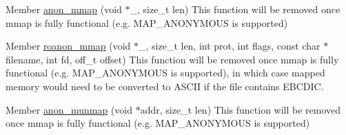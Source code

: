 
\begin{DoxyRefList}
\item[Member \mbox{\hyperlink{zos_8cc_a80836ddd1b6b15678df61b69152bacd5}{anon\+\_\+mmap}} (void $\ast$\+\_\+, size\+\_\+t len)]\label{deprecated__deprecated000001}%
%
This function will be removed once mmap is fully functional (e.\+g. M\+A\+P\+\_\+\+A\+N\+O\+N\+Y\+M\+O\+US is supported)  
\item[Member \mbox{\hyperlink{zos_8cc_a32c69fa6f4fe558cc2cfd9a9eb93096e}{roanon\+\_\+mmap}} (void $\ast$\+\_\+, size\+\_\+t len, int prot, int flags, const char $\ast$filename, int fd, off\+\_\+t offset)]\label{deprecated__deprecated000002}%
%
This function will be removed once mmap is fully functional (e.\+g. M\+A\+P\+\_\+\+A\+N\+O\+N\+Y\+M\+O\+US is supported), in which case mapped memory would need to be converted to A\+S\+C\+II if the file contains E\+B\+C\+D\+IC.  
\item[Member \mbox{\hyperlink{zos_8cc_aa00ab042a596dd63795d3791d34b8d29}{anon\+\_\+munmap}} (void $\ast$addr, size\+\_\+t len)]\label{deprecated__deprecated000003}%
%
This function will be removed once mmap is fully functional (e.\+g. M\+A\+P\+\_\+\+A\+N\+O\+N\+Y\+M\+O\+US is supported) 
\end{DoxyRefList}